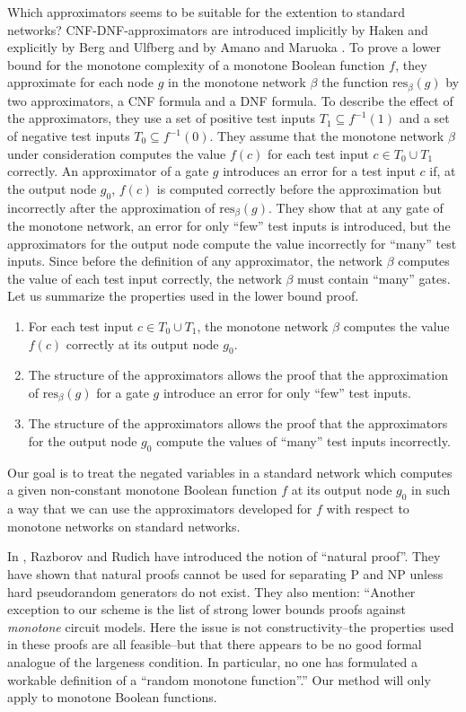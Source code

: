 \documentclass[11pt]{article}
\begin{document}
Which approximators seems to be suitable for the extention to standard networks?
CNF-DNF-approximators are introduced implicitly by Haken \cite{Ha} and explicitly by Berg and Ulfberg
\cite{BeUl} and by Amano and Maruoka \cite{AmMa}. To prove a lower bound for the monotone complexity of
a monotone Boolean function $f$, they approximate for each node $g$ in the monotone network $\beta$
the function $\mbox{res}_{\beta}(g)$ by two approximators, a CNF formula and a DNF formula. To describe the effect of
the approximators, they use a set of positive test inputs $T_1 \subseteq f^{-1}(1)$ and a set of negative test
inputs $T_0 \subseteq f^{-1}(0)$. They assume that the monotone network $\beta$ under consideration computes the
value $f(c)$ for each test input $c \in T_0 \cup T_1$ correctly.
An approximator of a gate $g$ introduces an error for a test input $c$ if,
at the output node $g_0$, $f(c)$ is computed correctly before the approximation but incorrectly after the
approximation of $\mbox{res}_{\beta}(g)$. They show that at any gate of the monotone network, an error for only
``few'' test inputs is introduced, but the approximators for the output node compute the value incorrectly for
``many'' test inputs. Since before the definition of any approximator, the network $\beta$ computes the value of
each test input correctly, the network $\beta$ must contain ``many'' gates. Let us summarize the properties used
in the lower bound proof.
\begin{enumerate}
\item
  For each test input $c \in T_0 \cup T_1$, the monotone network $\beta$ computes the value $f(c)$ correctly
  at its output node $g_0$.
\item
  The structure of the approximators allows the proof that the approximation of $\mbox{res}_{\beta}(g)$ for a
  gate $g$ introduce an error for only ``few'' test inputs.
\item
  The structure of the approximators allows the proof that the approximators for the output node $g_0$
  compute the values of ``many'' test inputs incorrectly.
\end{enumerate}

Our goal is to treat the negated variables in a standard network which computes a given non-constant monotone
Boolean function $f$ at its output node $g_0$ in such a way that we can use the approximators developed for $f$
with respect to monotone networks on standard networks. 

In \cite{RaRu}, Razborov and Rudich have introduced the notion of ``natural proof''. They have shown that
natural proofs cannot be used for separating P and NP unless hard pseudorandom generators do not
exist. They also mention:  ``Another exception to our scheme is the list of strong lower bounds proofs
against {\em monotone\/} circuit models. Here the issue is not constructivity--the properties used in these
proofs are all feasible--but that there appears to be no good formal analogue of the largeness condition.
In particular, no one has formulated a workable definition of a ``random monotone function''.''
Our method will only apply to monotone Boolean functions.
\end{document}
